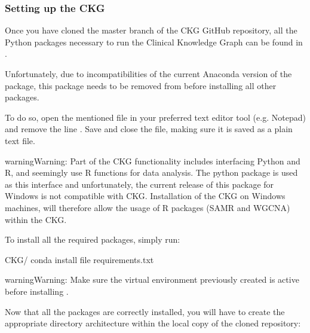 \documentclass[letterpaper,10pt,english]{sphinxmanual}
\begin{document}
\subsubsection{Setting up the CKG}
\label{\detokenize{intro/getting-started-with-windows:setting-up-the-ckg}}
Once you have cloned the master branch of the CKG GitHub repository, all the Python packages necessary to run the Clinical Knowledge Graph can be found in .

Unfortunately, due to incompatibilities of the current Anaconda version of the  package, this package needs to be removed from  before installing all other packages.

To do so, open the mentioned file in your preferred text editor tool (e.g. Notepad) and remove the line . Save and close the file, making sure it is saved as a plain text file.

\begin{sphinxadmonition}{warning}{Warning:}
Part of the CKG functionality includes interfacing Python and R, and seemingly use R functions for data analysis. The python package  is used as this interface and unfortunately, the current release of this package for Windows is not compatible with CKG. Installation of the CKG on Windows machines, will therefore  allow the usage of R packages (SAMR and WGCNA) within the CKG.
\end{sphinxadmonition}

To install all the required packages, simply run:

\begin{sphinxVerbatim}[commandchars=\\\{\}]
\PYGZgt{}  CKG/
\PYGZgt{} conda install \PYGZhy{}\PYGZhy{}file requirements.txt
\end{sphinxVerbatim}

\begin{sphinxadmonition}{warning}{Warning:}
Make sure the virtual environment previously created is active before installing .
\end{sphinxadmonition}

Now that all the packages are correctly installed, you will have to create the appropriate directory architecture within the local copy of the cloned repository:
\end{document}
